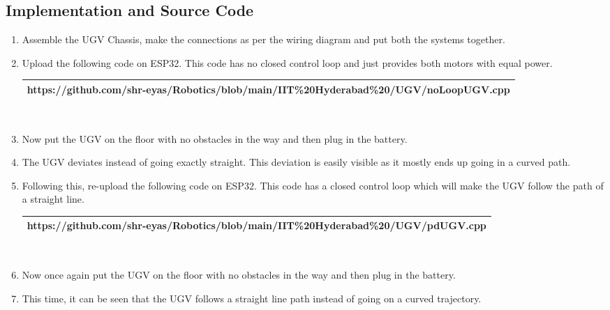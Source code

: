 \documentclass[journal,10pt]{article}
\begin{document}
\subsection{Implementation and Source Code}
\vspace{10pt}
\begin{enumerate}[label=\alph*.,labelindent=\parindent,leftmargin=*]

    \item Assemble the UGV Chassis, make the connections as per the wiring diagram and put both the systems together.

    \item Upload the following code on ESP32. This code has no closed control loop and just provides both motors with equal power. \vspace{10pt} \\
    \begin{tabularx}{0.9\textwidth} { 
    | >{\centering\arraybackslash}X |}
    \hline
    https://github.com/shr-eyas/Robotics/blob/main/IIT\%20Hyderabad\%20/UGV/noLoopUGV.cpp\\
    \hline
    \end{tabularx} \\

    \item Now put the UGV on the floor with no obstacles in the way and then plug in the battery.

    \item The UGV deviates instead of going exactly straight. This deviation is easily visible as it mostly ends up going in a curved path.  

    \item Following this, re-upload the following code on ESP32. This code has a closed control loop which will make the UGV follow the path of a straight line. \vspace{10pt} \\
    \begin{tabularx}{0.9\textwidth} { 
    | >{\centering\arraybackslash}X |}
    \hline
    https://github.com/shr-eyas/Robotics/blob/main/IIT\%20Hyderabad\%20/UGV/pdUGV.cpp\\
    \hline
    \end{tabularx} \\

    \item Now once again put the UGV on the floor with no obstacles in the way and then plug in the battery.

    \item This time, it can be seen that the UGV follows a straight line path instead of going on a curved trajectory.
    
\end{enumerate}
\end{document}
